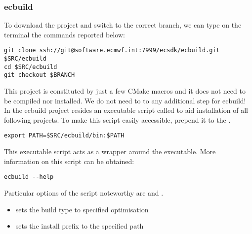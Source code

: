 \subsubsection{ecbuild}
To download the project and switch to the correct branch,
we can type on the terminal the commands reported below:
%
\begin{lstlisting}[style=BashStyle]
git clone ssh://git@software.ecmwf.int:7999/ecsdk/ecbuild.git $SRC/ecbuild
cd $SRC/ecbuild
git checkout $BRANCH
\end{lstlisting}
%
This project is constituted by just a few CMake macros 
and it does not need to be compiled nor installed.
We do not need to to any additional step for ecbuild!\\
%
In the ecbuild project resides an executable script called 
to aid installation of all following projects. To make this script
easily accessible, prepend it to the .
\begin{lstlisting}[style=BashStyle]
export PATH=$SRC/ecbuild/bin:$PATH
\end{lstlisting}
%
This executable script  acts as a wrapper around the
 executable. More information on this script can be 
obtained:
\begin{lstlisting}[style=BashStyle]
ecbuild --help
\end{lstlisting}
Particular options of the  script noteworthy are
 and .
\begin{itemize}
\setlength\itemsep{0.1em}
\item {} sets the build type to specified optimisation
\item {} sets the install prefix to the specified path
\end{itemize}

